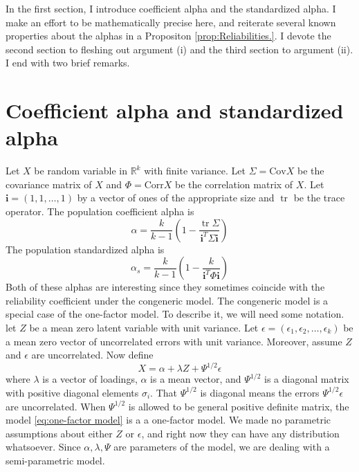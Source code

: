 \documentclass{article}
\theoremstyle{plain}
\theoremstyle{plain}
\theoremstyle{definition}
\theoremstyle{remark}
\theoremstyle{definition}
\theoremstyle{plain}
\theoremstyle{plain}
\theoremstyle{definition}
\DeclareMathOperator{\tr}{tr}
\begin{document}
In the first section, I introduce coefficient alpha and the standardized alpha. I make an effort to be mathematically precise here, and reiterate several known properties about the alphas in a Propositon \ref{prop:Reliabilities.}. I devote the second section to fleshing out argument (i) and the third section to argument (ii). I end with two brief remarks.
\section{Coefficient alpha and standardized alpha}

Let $X$ be random variable in $\mathbb{R}^{k}$ with finite variance.
Let $\Sigma=\textrm{Cov}X$ be the covariance matrix of $X$ and $\Phi=\textrm{Corr}X$
be the correlation matrix of $X$. Let $\mathbf{i}=\left(1,1,\ldots,1\right)$ by a vector of ones of the appropriate size and $\tr$ be the trace operator.
The population coefficient alpha \citep[][eq. 2]{cronbach1951coefficient} is
\begin{equation}
\alpha =  \frac{k}{k-1}\left(1-\frac{\tr\Sigma}{\mathbf{i}^{T}\Sigma\mathbf{i}}\right)\label{eq:Coefficient alpha}
\end{equation}
The population standardized alpha \citep[][eq. 2]{Falk2011-ae} is
\begin{equation}
\alpha_s=\frac{k}{k-1}\left(1-\frac{k}{\mathbf{i}^{T}\Phi\mathbf{i}}\right)\label{eq:standardized alpha}
\end{equation}
Both of these alphas are interesting since they sometimes coincide with the reliability coefficient under the congeneric model. 
The congeneric model is a special case of the one-factor model. To describe it, we will need some notation. let $Z$ be a mean zero latent variable with unit variance. Let $\epsilon=\left(\epsilon_{1},\epsilon_{2},\ldots,\epsilon_{k}\right)$
be a mean zero vector of uncorrelated errors with unit variance. Moreover, assume $Z$ and $\epsilon$ are uncorrelated. Now define
\begin{equation}
X=\alpha + \lambda Z+\Psi^{1/2}\epsilon\label{eq:one-factor model}
\end{equation}
where $\lambda$ is a vector of loadings, $\alpha$ is a mean vector, and $\Psi^{1/2}$ is a diagonal matrix with positive diagonal elements $\sigma_i$. That $\Psi^{1/2}$ is diagonal means the errors $\Psi^{1/2}\epsilon$ are uncorrelated. When $\Psi^{1/2}$ is allowed to be general positive definite matrix, the model \eqref{eq:one-factor model} is a a one-factor model. We made no parametric assumptions about either $Z$ or $\epsilon$, and right now they can have any distribution whatsoever. Since $\alpha,\lambda,\Psi$ are parameters of the model, we are dealing with a semi-parametric model.
\end{document}
